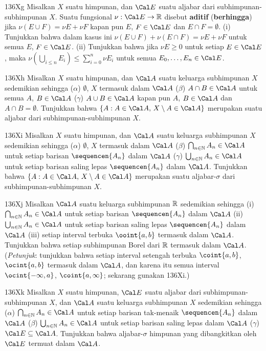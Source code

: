 {\spheader 136Xg Misalkan $X$ suatu himpunan, dan
$\Cal E$ suatu aljabar dari subhimpunan-subhimpunan $X$. Suatu fungsional
$\nu:\Cal E\to\Bbb R$ disebut {\bf aditif} ({\bf berhingga}) jika
$\nu(E\cup F)=\nu E+\nu F$ kapan pun $E$,
$F\in\Cal E$ dan $E\cap F=\emptyset$. (i) Tunjukkan bahwa dalam kasus ini
$\nu(E\cup F)+\nu(E\cap F)=\nu E+\nu F$ untuk semua $E$, $F\in\Cal E$.
(ii) Tunjukkan bahwa jika $\nu E\ge 0$ untuk setiap $E\in\Cal E$, maka
$\nu(\bigcup_{i\le n}E_i)\le\sum_{i=0}^n\nu E_i$ untuk semua
$E_0,\ldots,E_n\in\Cal E$.

\sqheader 136Xh Misalkan $X$ suatu himpunan, dan $\Cal A$ suatu keluarga
subhimpunan $X$ sedemikian sehingga ($\alpha$) $\emptyset$, $X$ termasuk
dalam $\Cal A$ ($\beta$) $A\cap B\in\Cal A$ untuk semua $A$,
$B\in\Cal A$ ($\gamma$) $A\cup B\in\Cal A$ kapan pun $A$, $B\in\Cal A$ dan
$A\cap B=\emptyset$. Tunjukkan bahwa
$\{A:A\in\Cal A,\,X\setminus A\in\Cal A\}$ merupakan suatu aljabar dari
subhimpunan-subhimpunan $X$.

\sqheader 136Xi Misalkan $X$ suatu himpunan, dan $\Cal A$ suatu keluarga
subhimpunan $X$ sedemikian sehingga ($\alpha$) $\emptyset$, $X$ termasuk
dalam $\Cal A$ ($\beta$) $\bigcap_{n\in\Bbb N}A_n\in\Cal A$ untuk setiap
barisan $\sequencen{A_n}$ dalam $\Cal A$ ($\gamma$)
$\bigcup_{n\in\Bbb N}A_n\in\Cal A$ untuk setiap barisan saling lepas
$\sequencen{A_n}$ dalam $\Cal A$. Tunjukkan bahwa
$\{A:A\in\Cal A,\,X\setminus A\in\Cal A\}$ merupakan suatu aljabar-$\sigma$
dari subhimpunan-subhimpunan $X$.

\sqheader 136Xj Misalkan $\Cal A$ suatu keluarga subhimpunan $\Bbb R$
sedemikian sehingga (i) $\bigcap_{n\in\Bbb N}A_n\in\Cal A$ untuk setiap
barisan $\sequencen{A_n}$ dalam $\Cal A$ (ii)
$\bigcup_{n\in\Bbb N}A_n\in\Cal A$ untuk setiap barisan saling lepas
$\sequencen{A_n}$ dalam $\Cal A$ (iii) setiap interval terbuka
$\ooint{a,b}$ termasuk dalam $\Cal A$. Tunjukkan bahwa setiap subhimpunan
Borel dari $\Bbb R$ termasuk dalam $\Cal A$. ({\it Petunjuk\/}: tunjukkan
bahwa setiap interval setengah terbuka $\coint{a,b}$, $\ocint{a,b}$ termasuk
dalam $\Cal A$, dan karena itu semua interval $\ocint{-\infty,a}$,
$\coint{a,\infty}$; sekarang gunakan 136Xi.)

\sqheader 136Xk Misalkan $X$ suatu himpunan, $\Cal E$ suatu aljabar dari
subhimpunan-subhimpunan $X$, dan $\Cal A$ suatu keluarga subhimpunan $X$
sedemikian sehingga ($\alpha$) $\bigcap_{n\in\Bbb N}A_n\in\Cal A$ untuk
setiap barisan tak-menaik $\sequencen{A_n}$ dalam $\Cal A$ ($\beta$)
$\bigcup_{n\in\Bbb N}A_n\in\Cal A$ untuk setiap barisan saling lepas dalam
$\Cal A$ ($\gamma$) $\Cal E\subseteq\Cal A$. Tunjukkan bahwa
aljabar-$\sigma$ himpunan yang dibangkitkan oleh $\Cal E$ termuat dalam
$\Cal A$. 

}
